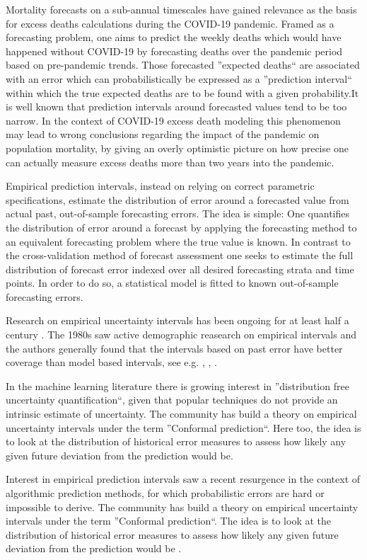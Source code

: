 \documentclass[12pt]{article}
\begin{document}
Mortality forecasts on a sub-annual timescales have gained relevance as the basis for excess deaths calculations during the COVID-19 pandemic. Framed as a forecasting problem, one aims to predict the weekly deaths which would have happened without COVID-19 by forecasting deaths over the pandemic period based on pre-pandemic trends. Those forecasted ''expected deaths`` are associated with an error which can probabilistically be expressed as a ''prediction interval`` within which the true expected deaths are to be found with a given probability.It is well known that prediction intervals around forecasted values tend to be too narrow. In the context of COVID-19 excess death modeling this phenomenon may lead to wrong conclusions regarding the impact of the pandemic on population mortality, by giving an overly optimistic picture on how precise one can actually measure excess deaths more than two years into the pandemic.

Empirical prediction intervals, instead on relying on correct parametric specifications, estimate the distribution of error around a forecasted value from actual past, out-of-sample forecasting errors. The idea is simple: One quantifies the distribution of error around a forecast by applying the forecasting method to an equivalent forecasting problem where the true value is known. In contrast to the cross-validation method of forecast assessment one seeks to estimate the full distribution of forecast error indexed over all desired forecasting strata and time points. In order to do so, a statistical model is fitted to known out-of-sample forecasting errors.

Research on empirical uncertainty intervals has been ongoing for at least half a century \cite{Williams1971}. The 1980s saw active demographic reasearch on empirical intervals and the authors generally found that the intervals based on past error have better coverage than model based intervals, see e.g. \cite{Stoto1983}, \cite{Cohen1986}, \cite{Smith1988}.

In the machine learning literature there is growing interest in ''distribution free uncertainty quantification``, given that popular techniques do not provide an intrinsic estimate of uncertainty. The community has build a theory on empirical uncertainty intervals under the term ''Conformal prediction``. Here too, the idea is to look at the distribution of historical error measures to assess how likely any given future deviation from the prediction would be.

Interest in empirical prediction intervals saw a recent resurgence in the context of algorithmic prediction methods, for which probabilistic errors are hard or impossible to derive. The community has build a theory on empirical uncertainty intervals under the term ''Conformal prediction``. The idea is to look at the distribution of historical error measures to assess how likely any given future deviation from the prediction would be \cite{Shafer2008}.
\end{document}
